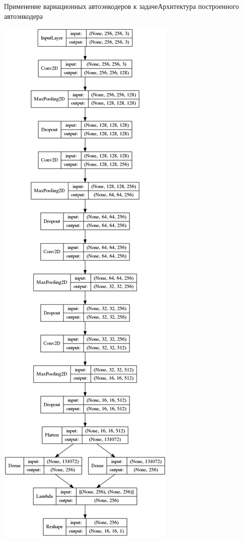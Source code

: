 \documentclass{beamer}
\begin{document}
\begin{frame}{Применение вариационных автоэнкодеров к задаче}{Архитектура построенного автоэнкодера}

\begin{minipage}{0.1\textwidth}
\begin{flushleft}
\includegraphics[scale=0.115]{encoder}

\end{flushleft}
\end{minipage}
\end{frame}
\end{document}
